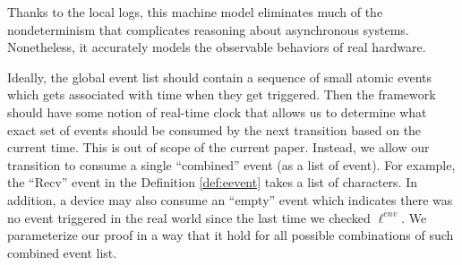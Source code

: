 Thanks to the local logs, this machine model eliminates much of the
nondeterminism that complicates reasoning about asynchronous systems.
Nonetheless, it accurately models the observable behaviors of real hardware.

Ideally, the global event list should contain a sequence of small atomic
events which gets associated with time when they get triggered. Then the framework
should have some notion of real-time clock that allows us to determine what exact
set of events should be consumed by the next transition based on the current time.
This is out of scope of the current paper. Instead, we allow our transition
to consume a single ``combined'' event (as a list of event). For example, the
``Recv'' event in the Definition \ref{def:eevent} takes a list of characters.
In addition, a device may also consume an ``empty'' event which indicates there
was no event triggered in the real world since the last time we checked $\ell^{env}$.
We parameterize our proof
in a way that it hold for all possible combinations of such combined event
list.




